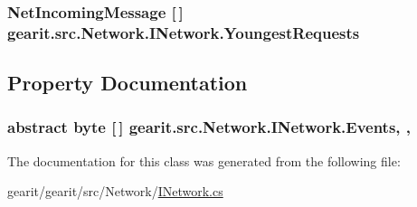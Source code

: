 \hypertarget{classgearit_1_1src_1_1_network_1_1_i_network_af6eabe64a0c59d32dad0d1429fa7e496}{
\subsubsection[{Youngest\+Requests}]{\setlength{\rightskip}{0pt plus 5cm}Net\+Incoming\+Message \mbox{[}$\,$\mbox{]} gearit.\+src.\+Network.\+I\+Network.\+Youngest\+Requests\hspace{0.3cm}{\ttfamily [protected]}}}\label{classgearit_1_1src_1_1_network_1_1_i_network_af6eabe64a0c59d32dad0d1429fa7e496}


\subsection{Property Documentation}
\hypertarget{classgearit_1_1src_1_1_network_1_1_i_network_ac156421a0022dc689e5a53a38927326a}{
\subsubsection[{Events}]{\setlength{\rightskip}{0pt plus 5cm}abstract byte \mbox{[}$\,$\mbox{]} gearit.\+src.\+Network.\+I\+Network.\+Events\hspace{0.3cm}{\ttfamily [get]}, {\ttfamily [set]}, {\ttfamily [protected]}}}\label{classgearit_1_1src_1_1_network_1_1_i_network_ac156421a0022dc689e5a53a38927326a}


The documentation for this class was generated from the following file\+:\begin{DoxyCompactItemize}
\item 
gearit/gearit/src/\+Network/\hyperlink{_i_network_8cs}{I\+Network.\+cs}\end{DoxyCompactItemize}
